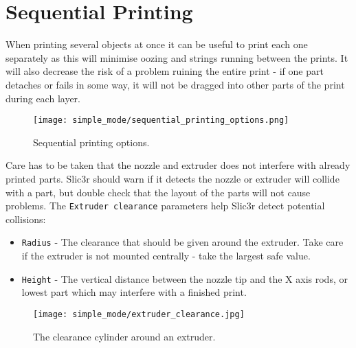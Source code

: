 
\section{Sequential Printing} %
\label{sec:sequential_printing}

When printing several objects at once it can be useful to print each one separately as this will minimise oozing and strings running between the prints.  It will also decrease the risk of a problem ruining the entire print - if one part detaches or fails in some way, it will not be dragged into other parts of the print during each layer.

\begin{figure}[H]
\centering
\texttt{[image: simple\_mode/sequential\_printing\_options.png]}
\caption{Sequential printing options.}
\label{fig:sequential_printing_options}
\end{figure}

Care has to be taken that the nozzle and extruder does not interfere with already printed parts.  Slic3r should warn if it detects the nozzle or extruder will collide with a part, but double check that the layout of the parts will not cause problems.  The \texttt{Extruder clearance} parameters help Slic3r detect potential collisions:
\begin{itemize}
	\item \texttt{Radius}  - The clearance that should be given around the extruder.  Take care if the extruder is not mounted centrally - take the largest safe value.
	\item \texttt{Height}  - The vertical distance between the nozzle tip and the X axis rods, or lowest part which may interfere with a finished print.
\end{itemize}

\begin{figure}[H]
\centering
\texttt{[image: simple\_mode/extruder\_clearance.jpg]}
\caption{The clearance cylinder around an extruder.}
\label{fig:a_diagram_depicting_extruder_clearance}
\end{figure}

